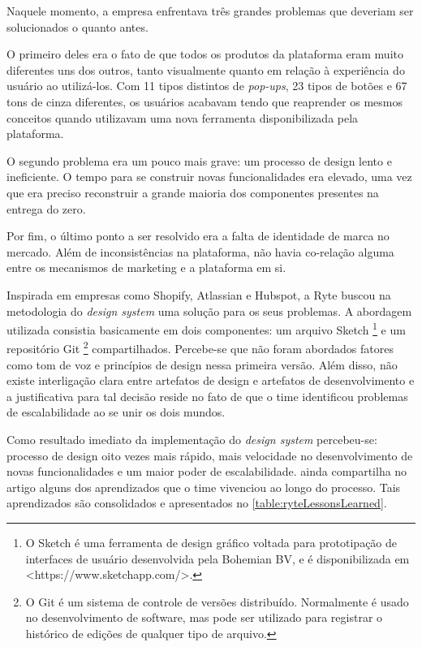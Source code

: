 Naquele momento, a empresa enfrentava três grandes problemas que deveriam ser solucionados o quanto antes.

O primeiro deles era o fato de que todos os produtos da plataforma eram muito diferentes uns dos outros, tanto visualmente quanto em relação à experiência do usuário ao utilizá-los. Com 11 tipos distintos de \textit{pop-ups}, 23 tipos de botões e 67 tons de cinza diferentes, os usuários acabavam tendo que reaprender os mesmos conceitos quando utilizavam uma nova ferramenta disponibilizada pela plataforma.

O segundo problema era um pouco mais grave: um processo de design lento e ineficiente. O tempo para se construir novas funcionalidades era elevado, uma vez que era preciso reconstruir a grande maioria dos componentes presentes na entrega do zero.

Por fim, o último ponto a ser resolvido era a falta de identidade de marca no mercado. Além de inconsistências na plataforma, não havia co-relação alguma entre os mecanismos de marketing e a plataforma em si.

Inspirada em empresas como Shopify, Atlassian e Hubspot, a Ryte buscou na metodologia do \textit{design system} uma solução para os seus problemas. A abordagem utilizada consistia basicamente em dois componentes: um arquivo Sketch \footnote{O Sketch é uma ferramenta de design gráfico voltada para prototipação de interfaces de usuário
desenvolvida pela Bohemian BV, e é disponibilizada em <https://www.sketchapp.com/>.} e um repositório Git \footnote{O Git é um sistema de controle de versões distribuído. Normalmente é usado no desenvolvimento de software, mas pode ser utilizado para registrar o histórico de edições de qualquer tipo de arquivo.} compartilhados. Percebe-se que não foram abordados fatores como tom de voz e princípios de design nessa primeira versão. Além disso, não existe interligação clara entre artefatos de design e artefatos de desenvolvimento e a justificativa para tal decisão reside no fato de que o time identificou problemas de escalabilidade ao se unir os dois mundos.

Como resultado imediato da implementação do \textit{design system} percebeu-se: processo de design oito vezes mais rápido, mais velocidade no desenvolvimento de novas funcionalidades e um maior poder de escalabilidade.  ainda compartilha no artigo alguns dos aprendizados que o time vivenciou ao longo do processo. Tais aprendizados são consolidados e apresentados no \autoref{table:ryteLessonsLearned}.

